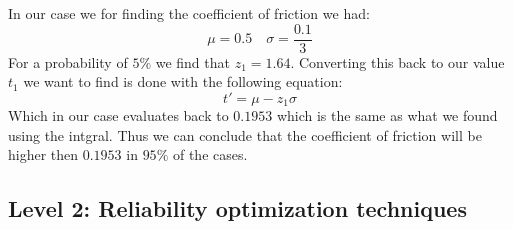 \documentclass[11pt, a4paper]{article}
\numberwithin{equation}{section}
\numberwithin{figure}{section}
\begin{document}
In our case we for finding the coefficient of friction we had:
\begin{equation*}
  \mu = 0.5 \quad \sigma = \frac{0.1}{3}
\end{equation*}
For a probability of $5\%$ we find that $z_1 = 1.64$. Converting this back to our value $t_1$ we want to find is done with the following equation:
\begin{equation}
  t' = \mu - z_1\sigma
\end{equation}
Which in our case evaluates back to $0.1953$ which is the same as what we found using the intgral. Thus we can conclude that the coefficient of friction will be higher then $0.1953$ in $95\%$ of the cases.


\subsection{Level 2: Reliability optimization techniques}
\end{document}

